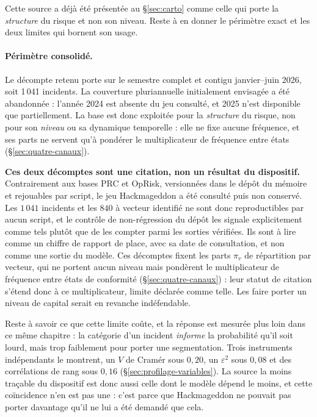Cette source a déjà été présentée au \S\ref{sec:carto} comme celle qui porte la
\emph{structure} du risque et non son niveau. Reste à en donner le périmètre exact et les
deux limites qui bornent son usage.

\paragraph{Périmètre consolidé.} Le décompte retenu porte sur le semestre complet et contigu
janvier--juin 2026, soit 1\,041 incidents. La couverture pluriannuelle initialement
envisagée a été abandonnée : l'année 2024 est absente du jeu consulté, et 2025 n'est
disponible que partiellement. La base est donc exploitée pour la \emph{structure} du risque,
non pour son \emph{niveau} ou sa dynamique temporelle : elle ne fixe aucune fréquence, et ses
parts ne servent qu'à pondérer le multiplicateur de fréquence entre états
(\S\ref{sec:quatre-canaux}).

\begin{attention}
\textbf{Ces deux décomptes sont une citation, non un résultat du dispositif.} Contrairement
aux bases PRC et OpRisk, versionnées dans le dépôt du mémoire et rejouables par script, le
jeu Hackmageddon a été consulté puis non conservé. Les $1\,041$ incidents et les
$840$ à vecteur identifié ne sont donc reproductibles par aucun script, et le contrôle de
non-régression du dépôt les signale explicitement comme tels plutôt que de les compter parmi
les sorties vérifiées. Ils sont à lire comme un chiffre de rapport de place, avec sa date de
consultation, et non comme une sortie du modèle. Ces décomptes fixent les parts $\pi_v$ de
répartition par vecteur, qui ne portent aucun niveau mais pondèrent le multiplicateur de
fréquence entre états de conformité (\S\ref{sec:quatre-canaux}) : leur statut de citation
s'étend donc à ce multiplicateur, limite déclarée comme telle. Les faire porter un niveau de
capital serait en revanche indéfendable.

\medskip
\noindent Reste à savoir ce que cette limite coûte, et la réponse est mesurée plus loin dans ce
même chapitre : la catégorie d'un incident \emph{informe} la probabilité qu'il soit lourd, mais
trop faiblement pour porter une segmentation. Trois instruments indépendants le montrent, un $V$
de Cramér sous $0{,}20$, un $\varepsilon^2$ sous $0{,}08$ et des corrélations de rang sous
$0{,}16$ (\S\ref{sec:profilage-variables}). La source la moins traçable du dispositif est donc aussi
celle dont le modèle dépend le moins, et cette coïncidence n'en est pas une : c'est parce que
Hackmageddon ne pouvait pas porter davantage qu'il ne lui a été demandé que cela.
\end{attention}

